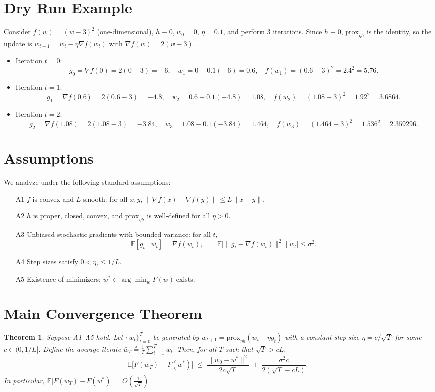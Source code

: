 \documentclass{article}
\newtheorem{theorem}{Theorem}
\newcommand{\prox}{\mathrm{prox}}
\newcommand{\E}{\mathbb{E}}
\begin{document}
\section*{Dry Run Example}
Consider $f(w)=(w-3)^2$ (one-dimensional), $h \equiv 0$, $w_0=0$, $\eta=0.1$, and perform $3$ iterations. Since $h\equiv 0$, $\prox_{\eta h}$ is the identity, so the update is $w_{t+1}=w_t-\eta \nabla f(w_t)$ with $\nabla f(w)=2(w-3)$.
\begin{itemize}
\item Iteration $t=0$:
\[
g_0 = \nabla f(0) = 2(0-3) = -6,\quad
w_1 = 0 - 0.1(-6) = 0.6,\quad
f(w_1)=(0.6-3)^2 = 2.4^2 = 5.76.
\]
\item Iteration $t=1$:
\[
g_1 = \nabla f(0.6) = 2(0.6-3) = -4.8,\quad
w_2 = 0.6 - 0.1(-4.8) = 1.08,\quad
f(w_2)=(1.08-3)^2 = 1.92^2 = 3.6864.
\]
\item Iteration $t=2$:
\[
g_2 = \nabla f(1.08) = 2(1.08-3) = -3.84,\quad
w_3 = 1.08 - 0.1(-3.84) = 1.464,\quad
f(w_3)=(1.464-3)^2 = 1.536^2 = 2.359296.
\]
\end{itemize}

\section*{Assumptions}
We analyze under the following standard assumptions:
\begin{itemize}
\item[A1] $f$ is convex and $L$-smooth: for all $x,y$, $\|\nabla f(x)-\nabla f(y)\| \le L\|x-y\|$.
\item[A2] $h$ is proper, closed, convex, and $\prox_{\eta h}$ is well-defined for all $\eta>0$.
\item[A3] Unbiased stochastic gradients with bounded variance: for all $t$,
\[
\E[g_t \mid w_t] = \nabla f(w_t), \qquad \E\big[\|g_t - \nabla f(w_t)\|^2 \mid w_t\big] \le \sigma^2.
\]
\item[A4] Step sizes satisfy $0<\eta_t \le 1/L$.
\item[A5] Existence of minimizers: $w^* \in \arg\min_w F(w)$ exists.
\end{itemize}

\section*{Main Convergence Theorem}
\begin{theorem}
Suppose A1--A5 hold. Let $\{w_t\}_{t=0}^T$ be generated by
$w_{t+1} = \prox_{\eta h}\!\left(w_t - \eta g_t\right)$ with a constant step size $\eta = c/\sqrt{T}$ for some $c \in (0,1/L]$. Define the average iterate $\bar w_T \triangleq \frac{1}{T}\sum_{t=1}^T w_t$. Then, for all $T$ such that $\sqrt{T} > cL$,
\[
\E\big[F(\bar w_T) - F(w^*)\big]
\;\le\; \frac{\|w_0 - w^*\|^2}{2c\sqrt{T}} \;+\; \frac{\sigma^2 c}{2(\sqrt{T} - cL)}.
\]
In particular, $\E\big[F(\bar w_T) - F(w^*)\big] = O\!\left(\frac{1}{\sqrt{T}}\right)$.
\end{theorem}
\end{document}
